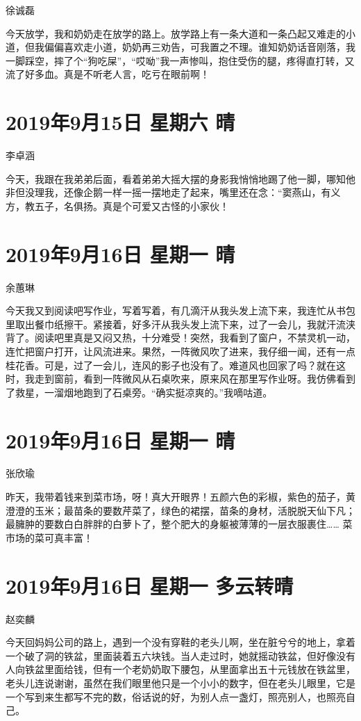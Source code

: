 徐诚磊

今天放学，我和奶奶走在放学的路上。放学路上有一条大道和一条凸起又难走的小道，但我偏偏喜欢走小道，奶奶再三劝告，可我置之不理。谁知奶奶话音刚落，我一脚踩空，摔了个“狗吃屎”，“哎呦”我一声惨叫，抱住受伤的腿，疼得直打转，又流了好多血。真是不听老人言，吃亏在眼前啊！

\section{2019年9月15日 星期六 晴}

李卓涵

今天，我跟在我弟弟后面，看着弟弟大摇大摆的身影我悄悄地踢了他一脚，哪知他非但没理我，还像企鹅一样一摇一摆地走了起来，嘴里还在念：“窦燕山，有义方，教五子，名俱扬。真是个可爱又古怪的小家伙！

\section{2019年9月16日 星期一 晴}

余蕙琳

今天我又到阅读吧写作业，写着写着，有几滴汗从我头发上流下来，我连忙从书包里取出餐巾纸擦干。紧接着，好多汗从我头发上流下来，过了一会儿，我就汗流浃背了。阅读吧里真是又闷又热，十分难受！突然，我看到了窗户，不禁灵机一动，连忙把窗户打开，让风流进来。果然，一阵微风吹了进来，我仔细一闻，还有一点桂花香。可是，过了一会儿，连风的影子也没有了。难道风也回家了吗？就在这时，我走到窗前，看到一阵微风从石桌吹来，原来风在那里写作业呀。我仿佛看到了救星，一溜烟地跑到了石桌旁。“确实挺凉爽的。”我嘀咕道。

\section{2019年9月16日 星期一 晴}

张欣瑜

昨天，我带着钱来到菜市场，呀！真大开眼界！五颜六色的彩椒，紫色的茄子，黄澄澄的玉米；最苗条的要数芹菜了，绿色的裙摆，苗条的身材，活脱脱天仙下凡；最臃肿的要数白白胖胖的白萝卜了，整个肥大的身躯被薄薄的一层衣服裹住…… 菜市场的菜可真丰富！

\section{2019年9月16日 星期一 多云转晴}

赵奕麟

今天回妈妈公司的路上，遇到一个没有穿鞋的老头儿啊，坐在脏兮兮的地上，拿着一个破了洞的铁盆，里面装着五六块钱。当人走过时，她就摇动铁盆，但好像没有人向铁盆里面给钱，但有一个老奶奶取下腰包，从里面拿出五十元钱放在铁盆里，老头儿连说谢谢，虽然在我们眼里他只是一个小小的数字，但在老头儿眼里，它是一个写到来生都写不完的数，俗话说的好，为别人点一盏灯，照亮别人，也照亮自己。

